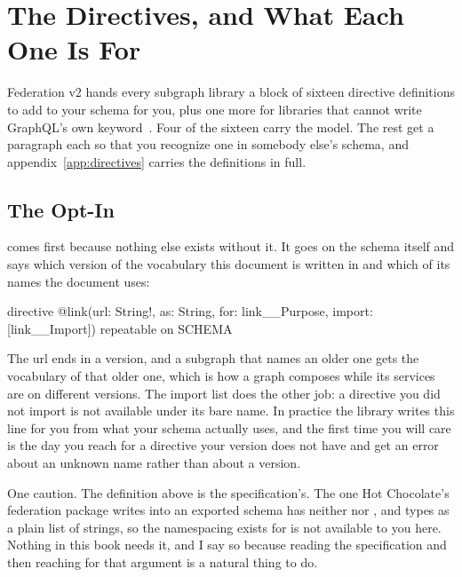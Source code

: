 \section{The Directives, and What Each One Is For}
\label{sec:ch05-the-directives}

%
Federation v2 hands every subgraph library a block of sixteen directive
definitions to add to your schema for you, plus one more for libraries that
cannot write GraphQL's own 
keyword~\autocite{apollosubgraphspec}. Four of the sixteen carry the model.
The rest get a paragraph each so that you recognize one in somebody else's
schema, and appendix~\ref{app:directives} carries the definitions in full.

\subsection{The Opt-In}

%
 comes first because nothing else exists without it. It goes on the
schema itself and says which version of the vocabulary this document is written
in and which of its names the document uses:

\begin{graphqlsdl}
directive @link(url: String!, as: String, for: link__Purpose,
                import: [link__Import]) repeatable on SCHEMA
\end{graphqlsdl}

%
The url ends in a version, and a subgraph that names an older one gets the
vocabulary of that older one, which is how a graph composes while its services
are on different versions. The import list does the other job: a directive you
did not import is not available under its bare name. In practice the library
writes this line for you from what your schema actually uses, and the first
time you will care is the day you reach for a directive your version does not
have and get an error about an unknown name rather than about a version.

%
One caution. The definition above is the specification's. The one Hot
Chocolate's federation package writes into an exported schema has neither
 nor , and types  as a plain list of strings, so
the namespacing  exists for is not available to you here. Nothing in
this book needs it, and I say so because reading the specification and
then reaching for that argument is a natural thing to do.

